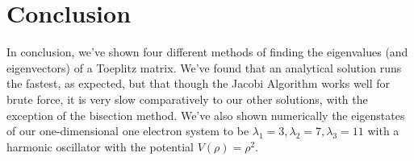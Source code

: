 \documentclass{article}
\begin{document}
\section{Conclusion}
In conclusion, we've shown four different methods of finding the eigenvalues (and eigenvectors) of a Toeplitz matrix. We've found that an analytical solution runs the fastest, as expected, but that though the Jacobi Algorithm works well for brute force, it is very slow comparatively to our other solutions, with the exception of the bisection method. We've also shown numerically the eigenstates of our one-dimensional one electron system to be $\lambda_1 = 3, \lambda_2 = 7, \lambda_3 = 11$ with a harmonic oscillator with the potential $V(\rho) = \rho^2$.


\end{document}

